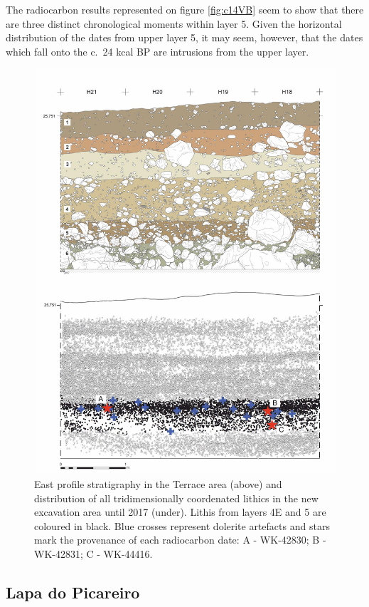 \documentclass[12pt,twoside]{reedthesis}
\begin{document}
The radiocarbon results represented on figure \ref{fig:c14VB} seem to show that there are three distinct chronological moments within layer 5. Given the horizontal distribution of the dates from upper layer 5, it may seem, however, that the dates which fall onto the c.~24 kcal BP are intrusions from the upper layer.
\begin{figure}[H]

{\centering \includegraphics[width=0.8\linewidth]{figure/SpatialanalysisVB} 

}

\caption{East profile stratigraphy in the Terrace area (above) and distribution of all tridimensionally coordenated lithics in the new excavation area until 2017 (under). Lithis from layers 4E and 5 are coloured in black. Blue crosses represent dolerite artefacts and stars mark the provenance of each radiocarbon date: A - WK-42830; B - WK-42831; C - WK-44416.}\label{fig:spatialvbfig}
\end{figure}
\hypertarget{lapa-do-picareiro-1}{%
\subsection{Lapa do Picareiro}\label{lapa-do-picareiro-1}}
\end{document}
